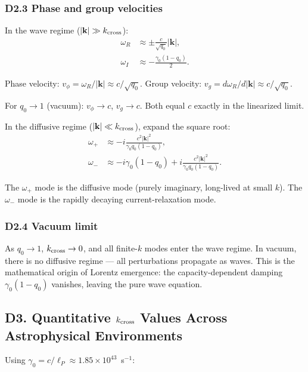 \documentclass[reprint]{revtex4-2}
\begin{document}
\subsubsection{D2.3 Phase and group velocities}

In the wave regime ($|\mathbf{k}| \gg k_{\rm cross}$):
\begin{align}
\omega_R &\approx \pm \frac{c}{\sqrt{q_0}}|\mathbf{k}|, \\
\omega_I &\approx -\frac{\gamma_0(1-q_0)}{2}.
\end{align}

Phase velocity: $v_\phi = \omega_R/|\mathbf{k}| \approx c/\sqrt{q_0}$.
Group velocity: $v_g = d\omega_R/d|\mathbf{k}| \approx c/\sqrt{q_0}$.

For $q_0 \to 1$ (vacuum): $v_\phi \to c$, $v_g \to c$. Both equal $c$ exactly in the linearized limit.

In the diffusive regime ($|\mathbf{k}| \ll k_{\rm cross}$), expand the square root:
\begin{align}
\omega_+ &\approx -i\frac{c^2|\mathbf{k}|^2}{\gamma_0 q_0(1-q_0)}, \\
\omega_- &\approx -i\gamma_0(1-q_0) + i\frac{c^2|\mathbf{k}|^2}{\gamma_0 q_0(1-q_0)}.
\end{align}

The $\omega_+$ mode is the diffusive mode (purely imaginary, long-lived at small $k$). The $\omega_-$ mode is the rapidly decaying current-relaxation mode.

\subsubsection{D2.4 Vacuum limit}

As $q_0 \to 1$, $k_{\rm cross} \to 0$, and all finite-$k$ modes enter the wave regime. In vacuum, there is no diffusive regime --- all perturbations propagate as waves. This is the mathematical origin of Lorentz emergence: the capacity-dependent damping $\gamma_0(1-q_0)$ vanishes, leaving the pure wave equation.

\subsection{D3. Quantitative $k_{\rm cross}$ Values Across Astrophysical Environments}

Using $\gamma_0 = c/\ell_P \approx 1.85\times 10^{43}$~s$^{-1}$:
\end{document}
